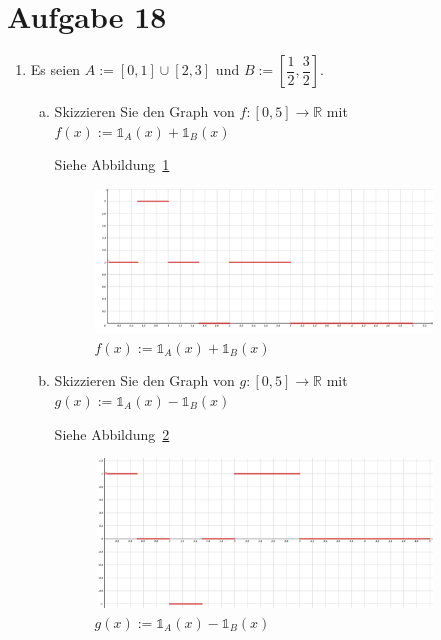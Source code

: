 \section{Aufgabe 18}
\setcounter{section}{18}

\begin{enumerate}[1.]
    \item Es seien $A := [0,1] \cup [2,3]$ und $B := [\dfrac{1}{2},
        \dfrac{3}{2}]$.

        \begin{enumerate}[(a)]
            \item Skizzieren Sie den Graph von $f : [0,5] \longrightarrow
                \mathbb{R}$ mit $f(x) := \mathds{1}_A(x) + \mathds{1}_B(x)$

                Siehe Abbildung~\ref{fig:abbildung-18-01}

                \begin{figure}[p]
                    \centering
                    \includegraphics[width=0.9\textwidth]{./assets/abbildung-18-01.png}
                    \caption{$f(x) := \mathds{1}_A(x) + \mathds{1}_B(x)$}
                    \label{fig:abbildung-18-01}
                \end{figure}

            \item Skizzieren Sie den Graph von $g: [0, 5] \longrightarrow
                \mathbb{R}$ mit $g(x) := \mathds{1}_A(x) - \mathds{1}_B(x)$

                Siehe Abbildung~\ref{fig:abbildung-18-02}

                \begin{figure}[p]
                    \centering
                    \includegraphics[width=0.9\textwidth]{./assets/abbildung-18-02.png}
                    \caption{$g(x) := \mathds{1}_A(x) - \mathds{1}_B(x)$}
                    \label{fig:abbildung-18-02}
                \end{figure}
        \end{enumerate}
\end{enumerate}
